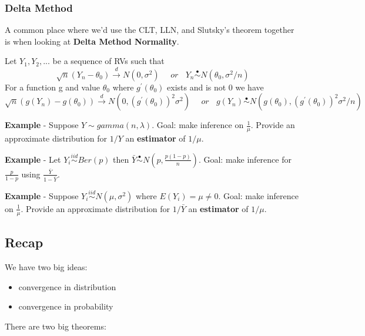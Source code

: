 \documentclass[
]{article}
\providecommand{\tightlist}{%
  \setlength{\itemsep}{0pt}\setlength{\parskip}{0pt}}
\begin{document}
\hypertarget{delta-method}{%
\subsubsection{Delta Method}\label{delta-method}}

A common place where we'd use the CLT, LLN, and Slutsky's theorem
together is when looking at \textbf{Delta Method Normality}.

\begin{description}
\tightlist
\item[\textbf{Large Sample Normality and the Delta Method}]
Let \(Y_1,Y_2,...\) be a sequence of RVs such that
\[\sqrt{n}(Y_n-\theta_0)\stackrel{d}{\rightarrow}N(0,\sigma^2)~~~~~~or~~~~Y_n\stackrel{\bullet}{\sim}N(\theta_0,\sigma^2/n)\]
For a function g and value \(\theta_0\) where \(g^{'}(\theta_0)\) exists
and is not 0 we have
\[\sqrt{n}(g(Y_n)-g(\theta_0))\stackrel{d}{\rightarrow}N(0,(g^{'}(\theta_0))^2\sigma^2)~~~~~~or~~~~g(Y_n)\stackrel{\bullet}{\sim}N(g(\theta_0),(g^{'}(\theta_0))^2\sigma^2/n)\]
\end{description}

\textbf{Example} - Suppose \(Y \sim gamma(n, \lambda)\). Goal: make
inference on \(\frac{1}{\mu}\). Provide an approximate distribution for
\(1/Y\) an \textbf{estimator} of \(1/\mu\).

\textbf{Example} - Let \(Y_i\stackrel{iid}{\sim}Ber(p)\) then
\(\bar{Y}\stackrel{\bullet}{\sim}N(p,\frac{p(1-p)}{n})\). Goal: make
inference for \(\frac{p}{1-p}\) using \(\frac{\bar{Y}}{1-\bar{Y}}\).

\textbf{Example} - Suppose \(Y_i\stackrel{iid}{\sim}N(\mu,\sigma^2)\)
where \(E(Y_i)=\mu\neq 0\). Goal: make inference on \(\frac{1}{\mu}\).
Provide an approximate distribution for \(1/\bar{Y}\) an
\textbf{estimator} of \(1/\mu\).

\hypertarget{recap}{%
\subsection{Recap}\label{recap}}

We have two big ideas:

\begin{itemize}
\tightlist
\item
  convergence in distribution
\item
  convergence in probability
\end{itemize}

There are two big theorems:
\end{document}
